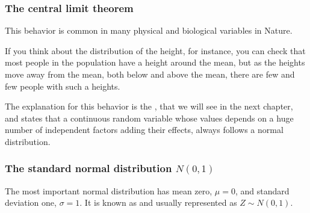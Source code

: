 \begin{frame}
\frametitle{The central limit theorem}
This behavior is common in many physical and biological variables in Nature.

If you think about the distribution of the height, for instance, you can check that most people in the population have a
height around the mean, but as the heights move away from the mean, both below and above the mean, there are few and few
people with such a heights.

The explanation for this behavior is the , that we will see in the next
chapter, and states that a continuous random variable whose values depends on a huge number of independent factors
adding their effects,  always follows a normal distribution.
\end{frame}


\begin{frame}
\frametitle{The standard normal distribution $N(0,1)$}
The most important normal distribution has mean zero, $\mu=0$, and standard deviation one, $\sigma=1$.
It is known as  and usually represented as $Z\sim N(0,1)$.
\begin{center}
\end{center}
\end{frame}


